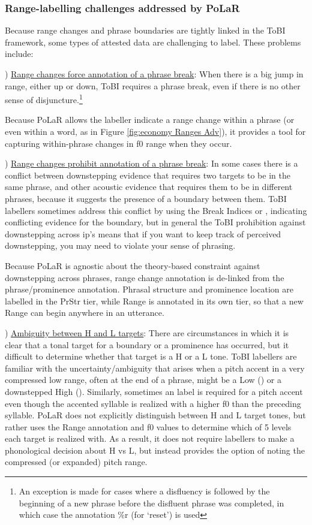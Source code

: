 \subsubsection{Range-labelling challenges addressed by PoLaR}\label{sec:range-labelling-challenges}
Because range changes and phrase boundaries are tightly linked in the ToBI framework, some types of attested data are challenging to label.  These problems include:

) \uline{Range changes force annotation of a phrase break}: When there is a big jump in range, either up or down, ToBI requires a phrase break, even if there is no other sense of disjuncture.\footnote{An exception is made for cases where a disfluency is followed by the beginning of a new phrase before the disfluent phrase was completed, in which case the annotation \%r (for ‘reset’) is used}

Because PoLaR allows the labeller indicate a range change within a phrase (or even within a word, as in Figure \ref{fig:economy Ranges Adv}), it provides a tool for capturing within-phrase changes in f0 range when they occur. 

) \uline{Range changes prohibit annotation of a phrase break}: In some cases there is a conflict between downstepping evidence that requires two targets to be in the same phrase, and other acoustic evidence that requires them to be in different phrases, because it suggests the presence of a boundary between them. ToBI labellers sometimes address this conflict by using the Break Indices  or , indicating conflicting evidence for the boundary, but in general the ToBI prohibition against downstepping across ip’s means that if you want to keep track of perceived downstepping, you may need to violate your sense of phrasing.

Because PoLaR is agnostic about the theory-based constraint against downstepping across phrases, range change annotation is de-linked from the phrase\slash prominence annotation. Phrasal structure and prominence location are labelled in the PrStr tier, while Range is annotated in its own tier, so that a new Range can begin anywhere in an utterance.

) \uline{Ambiguity between H and L targets}:  There are circumstances in which it is clear that a tonal target for a boundary or a prominence has occurred, but it difficult to determine whether that target is a H or a L tone.  ToBI labellers are familiar with the uncertainty\slash ambiguity that arises when a pitch accent in a very compressed low range, often at the end of a phrase, might be a Low () or a downstepped High ().  Similarly, sometimes an  label is required for a pitch accent even though the  accented syllable is realized with a higher f0 than the preceding syllable.  PoLaR does not explicitly distinguish between H and L target tones, but rather uses the Range annotation and f0 values to determine which of 5 levels each target is realized with.  As a result, it does not require labellers to make a phonological decision about H vs L, but instead provides the option of noting the compressed (or expanded) pitch range.

